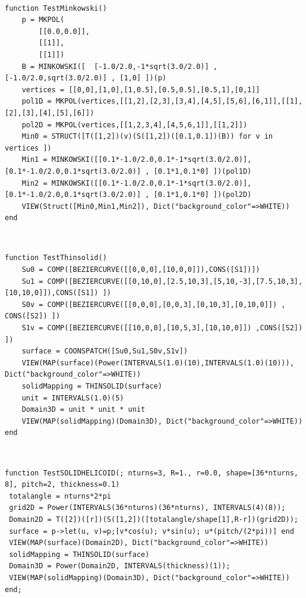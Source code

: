 \begin{coding}[Algebraic computation of FE = $\delta_1$]
\begin{condition}[aaaaaaa]\
\begin{lstlisting}[language=JuliaLocal, style=julia, mathescape=true]
function TestMinkowski()
	p = MKPOL(
		[[0.0,0.0]],
		[[1]],
		[[1]])
	B = MINKOWSKI([  [-1.0/2.0,-1*sqrt(3.0/2.0)] , [-1.0/2.0,sqrt(3.0/2.0)] , [1,0] ])(p)
	vertices = [[0,0],[1,0],[1,0.5],[0.5,0.5],[0.5,1],[0,1]]
	pol1D = MKPOL(vertices,[[1,2],[2,3],[3,4],[4,5],[5,6],[6,1]],[[1],[2],[3],[4],[5],[6]])
	pol2D = MKPOL(vertices,[[1,2,3,4],[4,5,6,1]],[[1,2]])
	Min0 = STRUCT([T([1,2])(v)(S([1,2])([0.1,0.1])(B)) for v in vertices ])
	Min1 = MINKOWSKI([[0.1*-1.0/2.0,0.1*-1*sqrt(3.0/2.0)],[0.1*-1.0/2.0,0.1*sqrt(3.0/2.0)] , [0.1*1,0.1*0] ])(pol1D)
	Min2 = MINKOWSKI([[0.1*-1.0/2.0,0.1*-1*sqrt(3.0/2.0)],[0.1*-1.0/2.0,0.1*sqrt(3.0/2.0)] , [0.1*1,0.1*0] ])(pol2D)
	VIEW(Struct([Min0,Min1,Min2]), Dict("background_color"=>WHITE))
end
\end{lstlisting}
\end{condition}

\begin{condition}[aaaaaaa]\
\begin{lstlisting}[language=JuliaLocal, style=julia, mathescape=true]
function TestThinsolid()
	Su0 = COMP([BEZIERCURVE([[0,0,0],[10,0,0]]),CONS([S1])])
	Su1 = COMP([BEZIERCURVE([[0,10,0],[2.5,10,3],[5,10,-3],[7.5,10,3],[10,10,0]]),CONS([S1]) ])
	S0v = COMP([BEZIERCURVE([[0,0,0],[0,0,3],[0,10,3],[0,10,0]]) , CONS([S2]) ]) 
	S1v = COMP([BEZIERCURVE([[10,0,0],[10,5,3],[10,10,0]]) ,CONS([S2]) ])
	surface = COONSPATCH([Su0,Su1,S0v,S1v])
	VIEW(MAP(surface)(Power(INTERVALS(1.0)(10),INTERVALS(1.0)(10))), Dict("background_color"=>WHITE))
	solidMapping = THINSOLID(surface)
	unit = INTERVALS(1.0)(5)
	Domain3D = unit * unit * unit
	VIEW(MAP(solidMapping)(Domain3D), Dict("background_color"=>WHITE))
end
\end{lstlisting}
\end{condition}

\begin{condition}[aaaaaaa]\
\begin{lstlisting}[language=JuliaLocal, style=julia, mathescape=true]
function TestSOLIDHELICOID(; nturns=3, R=1., r=0.0, shape=[36*nturns, 8], pitch=2, thickness=0.1)
 totalangle = nturns*2*pi
 grid2D = Power(INTERVALS(36*nturns)(36*nturns), INTERVALS(4)(8));
 Domain2D = T([2])([r])(S([1,2])([totalangle/shape[1],R-r])(grid2D));
 surface = p->let(u, v)=p;[v*cos(u); v*sin(u); u*(pitch/(2*pi))] end
 VIEW(MAP(surface)(Domain2D), Dict("background_color"=>WHITE))
 solidMapping = THINSOLID(surface)
 Domain3D = Power(Domain2D, INTERVALS(thickness)(1));
 VIEW(MAP(solidMapping)(Domain3D), Dict("background_color"=>WHITE))
end;
\end{lstlisting}
\end{condition}




\end{coding}
